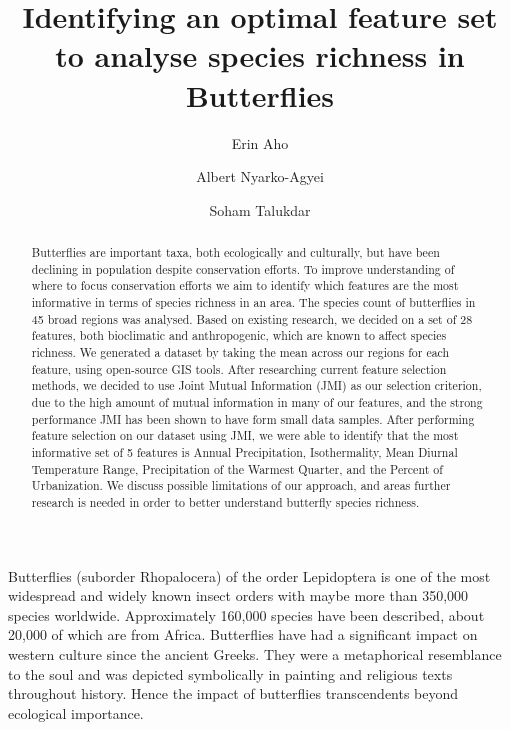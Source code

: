 \documentclass[prl,showpacs,superscriptaddress,twocolumn,longbibliography]{revtex4-1}
\begin{document}
\author{Erin Aho}
\author{Albert Nyarko-Agyei}
\author{Soham Talukdar}

\title{Identifying an optimal feature set to analyse species richness in Butterflies}


\begin{abstract}
Butterflies are important taxa, both ecologically and culturally, but have been declining in population despite conservation efforts. To improve understanding of where to focus conservation efforts we aim to identify which features are the most informative in terms of species richness in an area.
The species count of butterflies in 45 broad regions was analysed. Based on existing research, we decided on a set of 28 features, both bioclimatic and anthropogenic, which are known to affect species richness. We generated a dataset by taking the mean across our regions for each feature, using open-source GIS tools. After researching current feature selection methods, we decided to use Joint Mutual Information (JMI) as our selection criterion, due to the high amount of mutual information in many of our features, and the strong performance JMI has been shown to have form small data samples. After performing feature selection on our dataset using JMI, we were able to identify that the most informative set of 5 features is Annual Precipitation, Isothermality, Mean Diurnal Temperature Range, Precipitation of the Warmest Quarter, and the Percent of Urbanization. We discuss possible limitations of our approach, and areas further research is needed in order to better understand butterfly species richness.
\end{abstract}

\maketitle

Butterflies (suborder Rhopalocera) of the order Lepidoptera is one of the most widespread and widely known insect orders with maybe more than 350,000 species worldwide. Approximately 160,000 species have been described, about 20,000 of which are from Africa\cite{Arnold}. Butterflies have had a significant impact on western culture since the ancient Greeks. They were a metaphorical resemblance to the soul and was depicted symbolically in painting and religious texts throughout history\cite{Dicke2000}. Hence the impact of butterflies transcendents beyond ecological importance.
\end{document}
